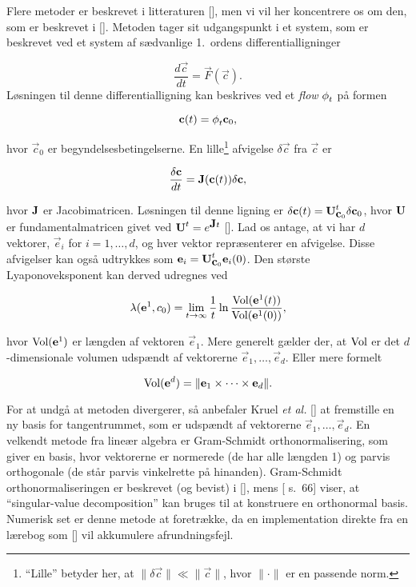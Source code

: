 \vspace{4.0mm}
Flere metoder er beskrevet i litteraturen
[], men vi vil her
koncentrere os om den, som er beskrevet i [].
Metoden tager sit udgangspunkt i et system, som er
beskrevet ved et system af s{\ae}dvanlige 1.\ ordens
differentialligninger

\[
  \frac{d\vec{c}}{dt} = \vec{F}(\vec{c}).
\]
L{\o}sningen til denne differentialligning kan beskrives ved et {\em
flow} $\matrix{\phi}_t$ p{\aa} formen

\[
  \vec{c}(t) = \matrix{\phi}_t \vec{c}_0,
\]

hvor $\vec{c}_0$ er begyndelsesbetingelserne. En lille\footnote{``Lille'' 
betyder her, at $\|\delta\vec{c}\| \ll
\|\vec{c}\|$, hvor $\|\cdot\|$ er en passende norm.}
afvigelse $\delta\vec{c}$ fra $\vec{c}$ er

\[
  \frac{\delta\vec{c}}{dt} = \matrix{J}(\vec{c}(t))\delta\vec{c},
\]

hvor $\matrix{J}$ er Jacobimatricen. L{\o}sningen til denne
ligning er $\delta\vec{c}(t) =
\matrix{U}_{\vec{c}_0}^t\delta\vec{c}_0$, hvor $\matrix{U}$
er fundamentalmatricen givet ved $\matrix{U}^t =
e^{\matrix{J}t}$ []. Lad os antage, at vi har
$d$ vektorer, $\vec{e}_i$ for $i=1,\ldots,d$, og hver
vektor repr{\ae}senterer en afvigelse. Disse afvigelser kan
ogs{\aa} udtrykkes som $\vec{e}_i =
\matrix{U}_{\vec{c}_0}^t\vec{e}_i(0)$. Den st{\o}rste
Lyaponoveksponent kan derved udregnes ved

\begin{equation}
\lambda(\matrix{e}^1, c_0) = \lim_{t\rightarrow\infty}
\frac{1}{t}\ln \frac{{\rm Vol}(\vec{e}^1(t))}{{\rm Vol}(\vec{e}^1(0))},
\end{equation}

hvor ${\rm Vol}(\vec{e}^1)$ er l{\ae}ngden af vektoren
$\vec{e}_1$. Mere generelt g{\ae}lder der, at ${\rm Vol}$
er det $d$-dimensionale volumen udsp{\ae}ndt af vektorerne
$\vec{e}_1, \ldots, \vec{e}_d$. Eller mere formelt

\[
  {\rm Vol}(\vec{e}^d) = \|\vec{e}_1 \times \cdots \times \vec{e}_d\|.
\]

For at undg{\aa} at metoden divergerer, s{\aa} anbefaler
Kruel {\em et al.\/} [] at fremstille en ny
basis for tangentrummet, som er udsp{\ae}ndt af vektorerne
$\vec{e}_1, \ldots, \vec{e}_d$. En velkendt metode fra
line{\ae}r algebra er Gram-Schmidt orthonormalisering, som
giver en basis, hvor vektorerne er normerede (de har alle
l{\ae}ngden 1) og parvis orthogonale (de st{\aa}r parvis
vinkelrette p{\aa} hinanden). Gram-Schmidt
orthonormaliseringen er beskrevet (og bevist) i
[], mens [ s.\ 66] viser, at
``singular-value decomposition'' kan bruges til at
konstruere en orthonormal basis. Numerisk set er denne
metode at foretr{\ae}kke, da en implementation direkte fra
en l{\ae}rebog som [] vil akkumulere
afrundningsfejl.

